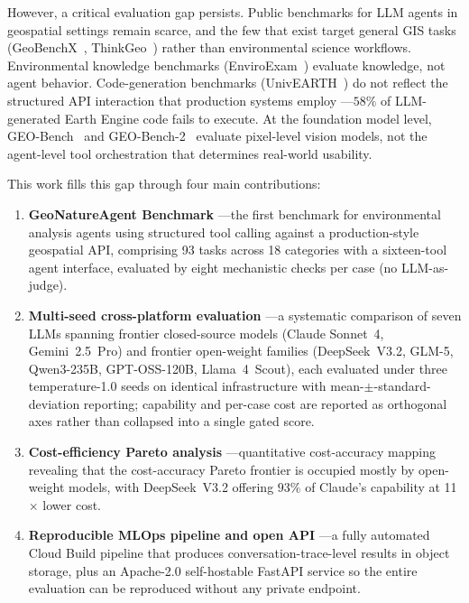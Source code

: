 \documentclass[sigconf]{acmart}
\begin{document}
However, a critical evaluation gap persists. Public benchmarks for LLM agents in geospatial settings remain scarce, and the few that exist target general GIS tasks (GeoBenchX~\citep{krechetova2025geobenchx}, ThinkGeo~\citep{shabbir2025thinkgeo}) rather than environmental science workflows. Environmental knowledge benchmarks (EnviroExam~\citep{huang2024enviroexam}) evaluate knowledge, not agent behavior. Code-generation benchmarks (UnivEARTH~\citep{kao2025univearth}) do not reflect the structured API interaction that production systems employ ---$58\%$ of LLM-generated Earth Engine code fails to execute. At the foundation model level, GEO-Bench~\citep{lacoste2023geobench} and GEO-Bench-2~\citep{simumba2025geobench2} evaluate pixel-level vision models, not the agent-level tool orchestration that determines real-world usability.

This work fills this gap through four main contributions:
\begin{enumerate}
    \item \textbf{GeoNatureAgent Benchmark} ---the first benchmark for environmental analysis agents using structured tool calling against a production-style geospatial API, comprising 93 tasks across 18 categories with a sixteen-tool agent interface, evaluated by eight mechanistic checks per case (no LLM-as-judge).
    \item \textbf{Multi-seed cross-platform evaluation} ---a systematic comparison of seven LLMs spanning frontier closed-source models (Claude Sonnet~4, Gemini~2.5~Pro) and frontier open-weight families (DeepSeek~V3.2, GLM-5, Qwen3-235B, GPT-OSS-120B, Llama~4~Scout), each evaluated under three tempe\-rature-1.0 seeds on identical infrastructure with mean-$\pm$-standard-deviation reporting; capability and per-case cost are reported as orthogonal axes rather than collapsed into a single gated score.
    \item \textbf{Cost-efficiency Pareto analysis} ---quantitative cost-accuracy mapping revealing that the cost-accuracy Pareto frontier is occupied mostly by open-weight models, with DeepSeek~V3.2 offering $93\%$ of Claude's capability at 11$\times$ lower cost.
    \item \textbf{Reproducible MLOps pipeline and open API} ---a fully automated Cloud Build pipeline that produces conversation-trace-level results in object storage, plus an Apache-2.0 self-hostable FastAPI service so the entire evaluation can be reproduced without any private endpoint.
\end{enumerate}
\end{document}
